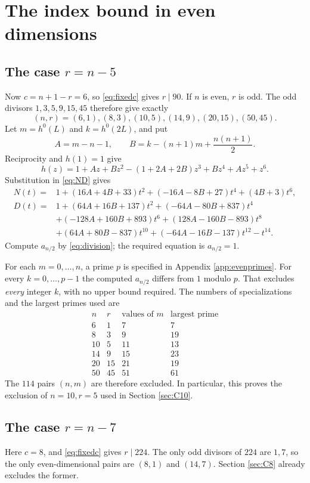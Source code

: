 \documentclass[11pt,reqno,letterpaper]{amsart}
\theoremstyle{definition}
\numberwithin{equation}{section}
\begin{document}
\section{The index bound in even dimensions}\label{sec:even}

\subsection{The case \texorpdfstring{$r=n-5$}{r=n-5}}\label{sec:even6}
Now $c=n+1-r=6$, so \eqref{eq:fixedc} gives $r\mid90$.
If $n$ is even, $r$ is odd. The odd divisors $1,3,5,9,15,45$
therefore give exactly
\[
 (n,r)=(6,1),(8,3),(10,5),(14,9),(20,15),(50,45).
\]
Let $m=h^0(L)$ and $k=h^0(2L)$, and put
\[
 A=m-n-1,\qquad B=k-(n+1)m+\frac{n(n+1)}2.
\]
Reciprocity and $h(1)=1$ give
\[
 h(z)=1+Az+Bz^2-(1+2A+2B)z^3+Bz^4+Az^5+z^6.
\]
Substitution in \eqref{eq:ND} gives
\begin{align*}
 N(t)={}&1+(16A+4B+33)t^2+(-16A-8B+27)t^4+(4B+3)t^6,\\
 D(t)={}&1+(64A+16B+137)t^2+(-64A-80B+837)t^4\\
 &+(-128A+160B+893)t^6+(128A-160B-893)t^8\\
 &+(64A+80B-837)t^{10}+(-64A-16B-137)t^{12}-t^{14}.
\end{align*}
Compute $a_{n/2}$ by \eqref{eq:division}; the required equation is
$a_{n/2}=1$.

For each $m=0,\ldots,n$, a prime $p$ is specified in
Appendix \ref{app:evenprimes}. For every $k=0,\ldots,p-1$ the computed
$a_{n/2}$ differs from $1$ modulo $p$.
That excludes \emph{every} integer $k$, with no upper bound required.
The numbers of specializations and the largest primes used are
\[
\begin{array}{r|r|r|r}
n&r&\text{values of }m&\text{largest prime}\\ \hline
6&1&7&7\\8&3&9&19\\10&5&11&13\\14&9&15&23\\
20&15&21&19\\50&45&51&61
\end{array}
\]
The $114$ pairs $(n,m)$ are therefore excluded. In particular,
this proves the exclusion of $n=10,r=5$ used in Section \ref{sec:C10}.

\subsection{The case \texorpdfstring{$r=n-7$}{r=n-7}}
Here $c=8$, and \eqref{eq:fixedc} gives $r\mid224$.
The only odd divisors of $224$ are $1,7$, so the only even-dimensional
pairs are $(8,1)$ and $(14,7)$. Section \ref{sec:C8} already excludes
the former.
\end{document}

